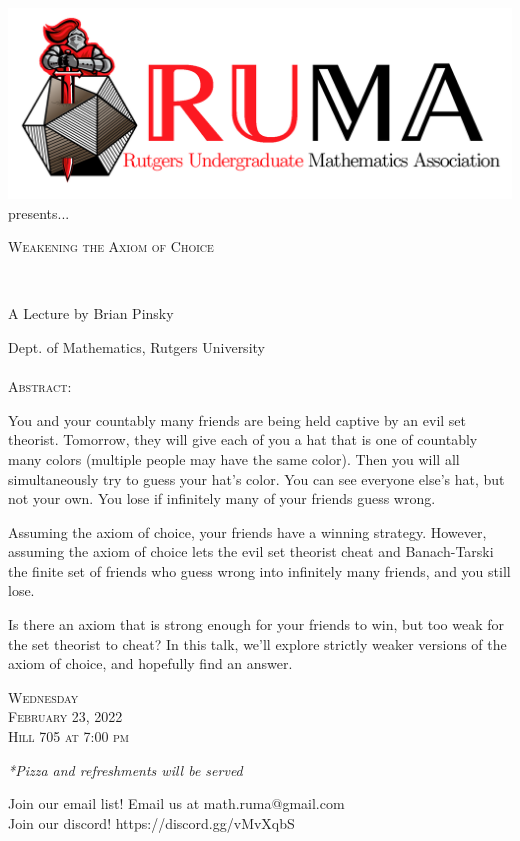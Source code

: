 \documentclass[12pt]{article}
\begin{document}

\begin{center}\includegraphics[scale=.5]{RUMAlogo.png}\\
presents... \\
\begin{spacing}{1}
{\fontsize{30}{30}\selectfont  \textsc{
Weakening the Axiom of Choice}} \end{spacing}
 

~~\\
\begin{spacing}{1.5}
{\fontsize{24}{24} \selectfont A Lecture by Brian Pinsky}  \end{spacing} 
\large Dept. of Mathematics, Rutgers University \\~~\\

\normalsize
\textsc{Abstract:}

\large
You and your countably many friends are being held captive by an
evil set theorist.  Tomorrow, they will give each of you a hat
that is one of countably many colors (multiple people may have the
same color).  Then you will all simultaneously try to guess your
hat's color.  You can see everyone else's hat, but not your own.
You lose if infinitely many of your friends guess wrong. 

\vspace{2mm} 
Assuming the axiom of choice, your friends have a winning
strategy.  However, assuming the axiom of choice lets the evil set
theorist cheat and Banach-Tarski the finite set of friends who
guess wrong into infinitely many friends, and you still lose. 

\vspace{2mm} 
Is there an axiom that is strong enough for your friends to win,
but too weak for the set theorist to cheat?  In this talk, we'll
explore strictly weaker versions of the axiom of choice, and
hopefully find an answer.  

\vspace{2mm} 
\huge   \textsc{Wednesday\\February 23, 2022 \\Hill 705 at 7:00
  pm}

\vspace{2mm}
\large
\emph{*Pizza and refreshments will be served}

  \Large  Join our email list! Email us at
  math.ruma@gmail.com\\Join our discord!
  https://discord.gg/vMvXqbS
\end{center}
\end{document}
